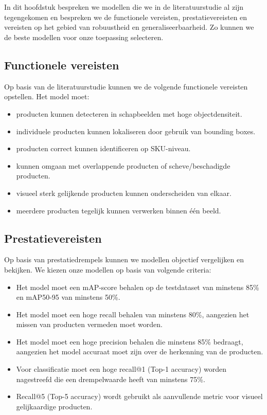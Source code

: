 \chapter{}%
\label{ch:requirementsanalyse}

In dit hoofdstuk bespreken we modellen die we in de literatuurstudie al zijn tegengekomen en bespreken we de functionele vereisten, prestatievereisten en vereisten op het gebied van robuustheid en generaliseerbaarheid. Zo kunnen we de beste modellen voor onze toepassing selecteren.

\section{Functionele vereisten}

Op basis van de literatuurstudie kunnen we de volgende functionele vereisten opstellen. Het model moet:
\begin{itemize}
    \item producten kunnen detecteren in schapbeelden met hoge objectdensiteit.
    \item individuele producten kunnen lokaliseren door gebruik van bounding boxes.
    \item producten correct kunnen identificeren op SKU-niveau.
    \item kunnen omgaan met overlappende producten of scheve/beschadigde producten.
    \item visueel sterk gelijkende producten kunnen onderscheiden van elkaar.
    \item meerdere producten tegelijk kunnen verwerken binnen één beeld.
\end{itemize}


\section{Prestatievereisten}
\label{sec:prestatievereisten}

Op basis van prestatiedrempels kunnen we modellen objectief vergelijken en bekijken. We kiezen onze modellen op basis van volgende criteria:
\begin{itemize}
    \item Het model moet een mAP-score behalen op de testdataset van minstens 85\% en mAP50-95 van minstens 50\%.
    \item Het model moet een hoge recall behalen van minstens 80\%, aangezien het missen van producten vermeden moet worden.
    \item Het model moet een hoge precision behalen die minstens 85\% bedraagt, aangezien het model accuraat moet zijn over de herkenning van de producten.
    \item Voor classificatie moet een hoge recall@1 (Top-1 accuracy) worden nagestreefd die een drempelwaarde heeft van minstens 75\%.
    \item Recall@5 (Top-5 accuracy) wordt gebruikt als aanvullende metric voor visueel gelijkaardige producten.
\end{itemize}


